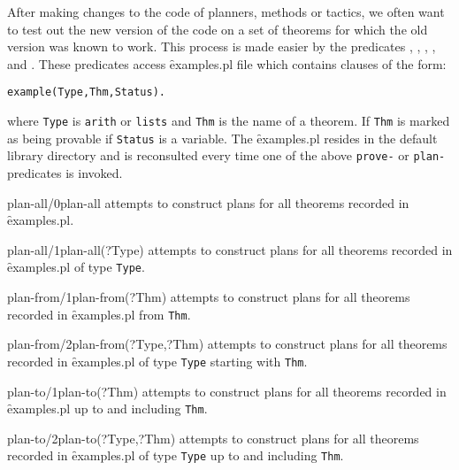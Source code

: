 After making changes to the code of planners, methods or tactics, we
often want to test out the new version of the code on a set of
theorems for which the old version was known to work. This process is
made easier by the predicates , ,
, ,  and 
. These predicates access \f{examples.pl}
file which contains clauses of the form:
\begin{verbatim}
example(Type,Thm,Status).
\end{verbatim}
where {\tt Type} is {\tt arith} or {\tt lists} and {\tt Thm} is
the name of a theorem. If {\tt Thm} is marked as being provable if
{\tt Status} is a variable. The \f{examples.pl} resides in the
default library directory and is reconsulted every time one of
the above {\tt prove-} or {\tt plan-} predicates is invoked. 

\begin{predicate}{plan-all/0}{plan-all}%
attempts to construct plans for all theorems recorded in \f{examples.pl}.
\end{predicate}

\begin{predicate}{plan-all/1}{plan-all(?Type)}%
attempts to construct plans for all theorems recorded in \f{examples.pl} of type {\tt Type}.
\end{predicate}

\begin{predicate}{plan-from/1}{plan-from(?Thm)}%
attempts to construct plans for all theorems recorded in \f{examples.pl} from {\tt Thm}.
\end{predicate}

\begin{predicate}{plan-from/2}{plan-from(?Type,?Thm)}%
attempts to construct plans for all theorems recorded in \f{examples.pl} of type {\tt Type} starting with {\tt Thm}.
\end{predicate}

\begin{predicate}{plan-to/1}{plan-to(?Thm)}%
attempts to construct plans for all theorems
recorded in \f{examples.pl} up to and including {\tt Thm}.
\end{predicate}

\begin{predicate}{plan-to/2}{plan-to(?Type,?Thm)}%
attempts to construct plans for all theorems
recorded in \f{examples.pl} of type {\tt Type} up to
and including {\tt Thm}.
\end{predicate}

